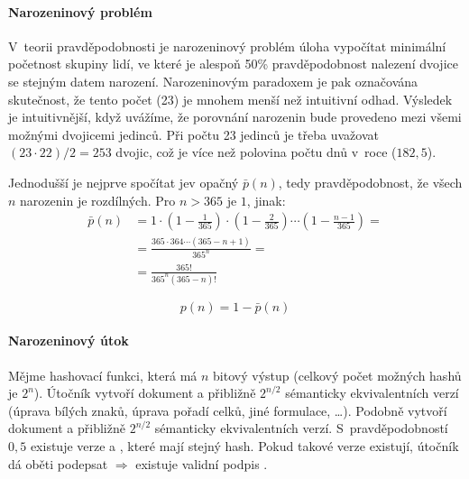 \paragraph*{Narozeninový problém} V~teorii pravděpodobnosti je narozeninový problém úloha vypočítat minimální početnost skupiny lidí, ve které je alespoň 50\% pravděpodobnost nalezení dvojice se stejným datem narození. Narozeninovým paradoxem je pak označována skutečnost, že tento počet (23) je mnohem menší než intuitivní odhad.
Výsledek je intuitivnější, když uvážíme, že porovnání narozenin bude provedeno mezi všemi možnými dvojicemi jedinců. Při počtu 23 jedinců je třeba uvažovat $(23 \cdot 22) / 2 = 253$ dvojic, což je více než polovina počtu dnů v~roce ($182,5$).

Jednodušší je nejprve spočítat jev opačný $\bar p(n)$, tedy pravděpodobnost, že všech $n$ narozenin je rozdílných. Pro $n > 365$ je $1$, jinak:
\begin{equation}
\begin{aligned}
\bar p(n) &= 1 \cdot \left(1-\frac{1}{365}\right) \cdot \left(1-\frac{2}{365}\right) \cdots \left(1-\frac{n-1}{365}\right) = \\
&=  \frac{365 \cdot 364 \cdots (365-n+1)}{365^n} = \\
&=  \frac{365!}{365^n (365-n)!}
\end{aligned}
\end{equation}

\begin{equation}
    p(n) = 1 - \bar p(n)
\end{equation}

\paragraph*{Narozeninový útok} Mějme hashovací funkci, která má $n$ bitový výstup (celkový počet možných hashů je $2^{n}$). Útočník vytvoří dokument  a přibližně $2^{n/2}$ sémanticky ekvivalentních verzí (úprava bílých znaků, úprava pořadí celků, jiné formulace, \dots). Podobně vytvoří dokument  a přibližně $2^{n/2}$ sémanticky ekvivalentních verzí. S~pravděpodobností $0,5$ existuje verze  a , které mají stejný hash. Pokud takové verze existují, útočník dá oběti podepsat  $\Rightarrow$ existuje validní podpis .

